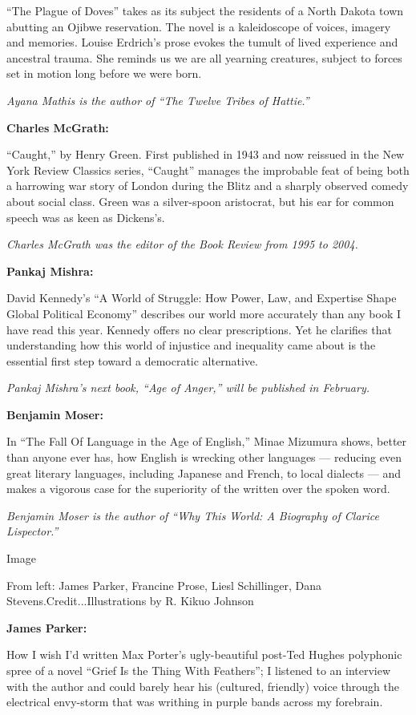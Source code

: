 ``The Plague of Doves'' takes as its subject the residents of a North
Dakota town abutting an Ojibwe reservation. The novel is a kaleidoscope
of voices, imagery and memories. Louise Erdrich's prose evokes the
tumult of lived experience and ancestral trauma. She reminds us we are
all yearning creatures, subject to forces set in motion long before we
were born.

\emph{Ayana Mathis is the author of ``The Twelve Tribes of Hattie.''}

\textbf{Charles McGrath:}

``Caught,'' by Henry Green. First published in 1943 and now reissued in
the New York Review Classics series, ``Caught'' manages the improbable
feat of being both a harrowing war story of London during the Blitz and
a sharply observed comedy about social class. Green was a silver-spoon
aristocrat, but his ear for common speech was as keen as Dickens's.

\emph{Charles McGrath was the editor of the Book Review from 1995 to
2004.}

\textbf{Pankaj Mishra:}

David Kennedy's ``A World of Struggle: How Power, Law, and Expertise
Shape Global Political Economy'' describes our world more accurately
than any book I have read this year. Kennedy offers no clear
prescriptions. Yet he clarifies that understanding how this world of
injustice and inequality came about is the essential first step toward a
democratic alternative.

\emph{Pankaj Mishra's next book, ``Age of Anger,'' will be published in
February.}

\textbf{Benjamin Moser:}

In ``The Fall Of Language in the Age of English,'' Minae Mizumura shows,
better than anyone ever has, how English is wrecking other languages ---
reducing even great literary languages, including Japanese and French,
to local dialects --- and makes a vigorous case for the superiority of
the written over the spoken word.

\emph{Benjamin Moser is the author of ``Why This World: A Biography of
Clarice Lispector.''}

Image

From left: James Parker, Francine Prose, Liesl Schillinger, Dana
Stevens.Credit...Illustrations by R. Kikuo Johnson

\textbf{James Parker:}

How I wish I'd written Max Porter's ugly-beautiful post-Ted Hughes
polyphonic spree of a novel ``Grief Is the Thing With Feathers''; I
listened to an interview with the author and could barely hear his
(cultured, friendly) voice through the electrical envy-storm that was
writhing in purple bands across my forebrain.

